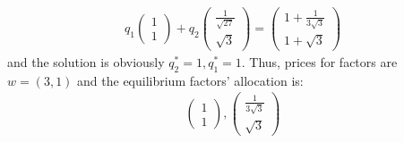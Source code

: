 \documentclass[a4paper]{article}
\begin{document}
\begin{align*}
q_1 \begin{pmatrix}
1\\
1
\end{pmatrix} + q_2 \begin{pmatrix}
\frac{1}{\sqrt{27}}\\
\sqrt{3}
\end{pmatrix} = \begin{pmatrix}
1 + \frac{1}{3\sqrt{3}}\\
1 + \sqrt{3}
\end{pmatrix}
\end{align*}
and the solution is obviously $q_2^* = 1, q_1^* = 1$. Thus, prices for factors are $w = (3, 1)$ and the equilibrium factors' allocation is:
\begin{align*}
\begin{pmatrix}
1\\
1
\end{pmatrix}, \begin{pmatrix}
\frac{1}{3\sqrt{3}}\\
\sqrt{3}
\end{pmatrix}
\end{align*}
\end{document}
